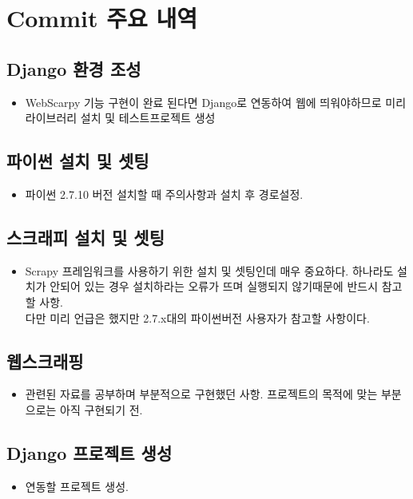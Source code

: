 \documentclass[aps,10pt,a4paper]{article}
\begin{document}
\section{Commit 주요  내역} 
\subsection{Django 환경 조성}

\begin{itemize}
\item WebScarpy 기능 구현이 완료 된다면 Django로 연동하여 웹에 띄워야하므로 미리 라이브러리 설치 및 테스트프로젝트 생성   
\end{itemize}

\subsection{파이썬 설치 및 셋팅}
\begin{itemize}
\item 파이썬 2.7.10 버전 설치할 때 주의사항과 설치 후 경로설정.    
\end{itemize}

\subsection{스크래피 설치 및 셋팅}
\begin{itemize}
\item Scrapy 프레임워크를 사용하기 위한 설치 및 셋팅인데 매우 중요하다. 하나라도 설치가 안되어 있는 경우 설치하라는 오류가 뜨며 실행되지 않기때문에 반드시 참고할 사항.\\다만 미리 언급은 했지만 2.7.x대의 파이썬버전 사용자가 참고할 사항이다.    
\end{itemize}

\subsection{웹스크래핑}
\begin{itemize}
\item 관련된 자료를 공부하며 부분적으로 구현했던 사항. 프로젝트의 목적에 맞는 부분으로는 아직 구현되기 전.    
\end{itemize}

\subsection{Django 프로젝트 생성}
\begin{itemize}
\item 연동할 프로젝트 생성.   
\end{itemize}
\end{document}
